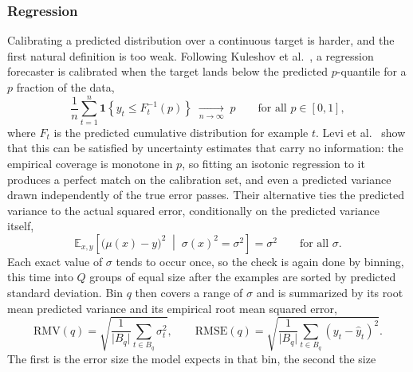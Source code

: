     \subsubsection{Regression}
        Calibrating a predicted distribution over a continuous target is harder, and
        the first natural definition is too weak. Following Kuleshov et
        al.~\cite{kuleshov2018}, a regression forecaster is calibrated when the target
        lands below the predicted $p$-quantile for a $p$ fraction of the data,
        \begin{equation}
            \frac{1}{n} \sum_{t=1}^{n} \mathbf{1}\!\left\{ y_t \le F_t^{-1}(p) \right\}
            \;\xrightarrow[n \to \infty]{}\; p
            \qquad \text{for all } p \in [0, 1],
            \label{eq:bg:unc:calibreg}
        \end{equation}
        where $F_t$ is the predicted cumulative distribution for example $t$. Levi et
        al.~\cite{levi2022} show that this can be satisfied by uncertainty estimates
        that carry no information: the empirical coverage is monotone in $p$, so
        fitting an isotonic regression to it produces a perfect match on the
        calibration set, and even a predicted variance drawn independently of the true
        error passes. Their alternative ties the predicted variance to the actual
        squared error, conditionally on the predicted variance itself,
        \begin{equation}
            \mathbb{E}_{x, y}\!\left[ \bigl( \mu(x) - y \bigr)^{2}
            \;\middle|\; \sigma(x)^{2} = \sigma^{2} \right] = \sigma^{2}
            \qquad \text{for all } \sigma .
            \label{eq:bg:unc:varcalib}
        \end{equation}
        Each exact value of $\sigma$ tends to occur once, so the check is again done by
        binning, this time into $Q$ groups of equal size after the examples are sorted
        by predicted standard deviation. Bin $q$ then covers a range of $\sigma$ and is
        summarized by its root mean predicted variance and its empirical root mean
        squared error,
        \begin{equation}
            \mathrm{RMV}(q) = \sqrt{ \frac{1}{\lvert B_q \rvert} \sum_{t \in B_q} \sigma_t^{2} },
            \qquad
            \mathrm{RMSE}(q) = \sqrt{ \frac{1}{\lvert B_q \rvert} \sum_{t \in B_q} (y_t - \hat{y}_t)^{2} } .
            \label{eq:bg:unc:rmvrmse}
        \end{equation}
        The first is the error size the model expects in that bin, the second the size
